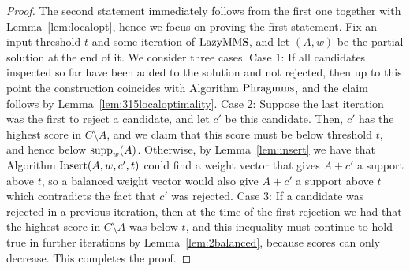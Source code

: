 \begin{proof}
The second statement immediately follows from the first one together with Lemma~\ref{lem:localopt}, hence we focus on proving the first statement. 
Fix an input threshold $t$ and some iteration of $\operatorname{LazyMMS}$, and let $(A,w)$ be the partial solution at the end of it. 
We consider three cases. Case 1: If all candidates inspected so far have been added to the solution and not rejected, then up to this point the construction coincides with Algorithm $\operatorname{Phragmms}$, and the claim follows by Lemma~\ref{lem:315localoptimality}. 
Case 2: Suppose the last iteration was the first to reject a candidate, and let $c'$ be this candidate. Then, $c'$ has the highest score in $C\setminus A$, and we claim that this score must be below threshold $t$, and hence below $\operatorname{supp}_w(A)$. Otherwise, by Lemma~\ref{lem:insert} we have that Algorithm $\operatorname{Insert}(A,w,c',t)$ could find a weight vector that gives $A+c'$ a support above $t$, so a balanced weight vector would also give $A+c'$ a support above $t$ which contradicts the fact that $c'$ was rejected. 
Case 3: If a candidate was rejected in a previous iteration, then at the time of the first rejection we had that the highest score in $C\setminus A$ was below $t$, and this inequality must continue to hold true in further iterations by Lemma~\ref{lem:2balanced}, because scores can only decrease. This completes the proof.
\end{proof}